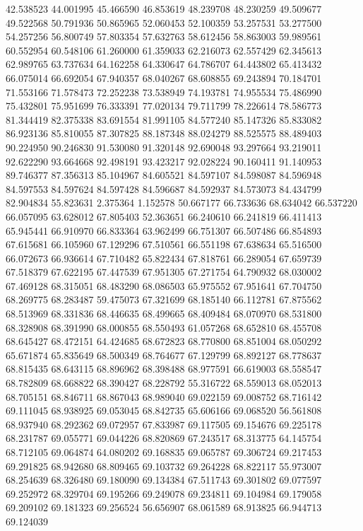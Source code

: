 42.538523
44.001995
45.466590
46.853619
48.239708
48.230259
49.509677
49.522568
50.791936
50.865965
52.060453
52.100359
53.257531
53.277500
54.257256
56.800749
57.803354
57.632763
58.612456
58.863003
59.989561
60.552954
60.548106
61.260000
61.359033
62.216073
62.557429
62.345613
62.989765
63.737634
64.162258
64.330647
64.786707
64.443802
65.413432
66.075014
66.692054
67.940357
68.040267
68.608855
69.243894
70.184701
71.553166
71.578473
72.252238
73.538949
74.193781
74.955534
75.486990
75.432801
75.951699
76.333391
77.020134
79.711799
78.226614
78.586773
81.344419
82.375338
83.691554
81.991105
84.577240
85.147326
85.833082
86.923136
85.810055
87.307825
88.187348
88.024279
88.525575
88.489403
90.224950
90.246830
91.530080
91.320148
92.690048
93.297664
93.219011
92.622290
93.664668
92.498191
93.423217
92.028224
90.160411
91.140953
89.746377
87.356313
85.104967
84.605521
84.597107
84.598087
84.596948
84.597553
84.597624
84.597428
84.596687
84.592937
84.573073
84.434799
82.904834
55.823631
2.375364
1.152578
50.667177
66.733636
68.634042
66.537220
66.057095
63.628012
67.805403
52.363651
66.240610
66.241819
66.411413
65.945441
66.910970
66.833364
63.962499
66.751307
66.507486
66.854893
67.615681
66.105960
67.129296
67.510561
66.551198
67.638634
65.516500
66.072673
66.936614
67.710482
65.822434
67.818761
66.289054
67.659739
67.518379
67.622195
67.447539
67.951305
67.271754
64.790932
68.030002
67.469128
68.315051
68.483290
68.086503
65.975552
67.951641
67.704750
68.269775
68.283487
59.475073
67.321699
68.185140
66.112781
67.875562
68.513969
68.331836
68.446635
68.499665
68.409484
68.070970
68.531800
68.328908
68.391990
68.000855
68.550493
61.057268
68.652810
68.455708
68.645427
68.472151
64.424685
68.672823
68.770800
68.851004
68.050292
65.671874
65.835649
68.500349
68.764677
67.129799
68.892127
68.778637
68.815435
68.643115
68.896962
68.398488
68.977591
66.619003
68.558547
68.782809
68.668822
68.390427
68.228792
55.316722
68.559013
68.052013
68.705151
68.846711
68.867043
68.989040
69.022159
69.008752
68.716142
69.111045
68.938925
69.053045
68.842735
65.606166
69.068520
56.561808
68.937940
68.292362
69.072957
67.833987
69.117505
69.154676
69.225178
68.231787
69.055771
69.044226
68.820869
67.243517
68.313775
64.145754
68.712105
69.064874
64.080202
69.168835
69.065787
69.306724
69.217453
69.291825
68.942680
68.809465
69.103732
69.264228
68.822117
55.973007
68.254639
68.326480
69.180090
69.134384
67.511743
69.301802
69.077597
69.252972
68.329704
69.195266
69.249078
69.234811
69.104984
69.179058
69.209102
69.181323
69.256524
56.656907
68.061589
68.913825
66.944713
69.124039
